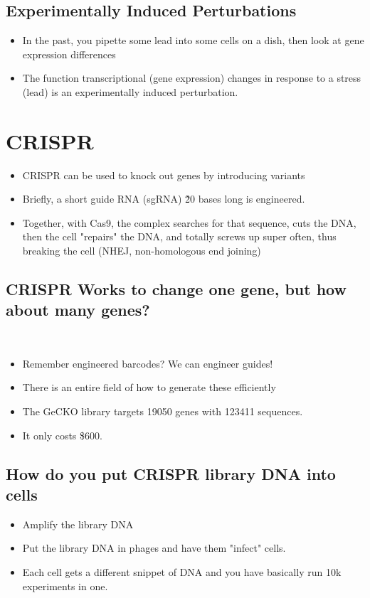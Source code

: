 \documentclass[10pt]{article}
\begin{document}
\subsection*{Experimentally Induced Perturbations}
\begin{itemize}
    \item In the past, you pipette some lead into some cells on a dish, then look at gene expression differences
    \item The function transcriptional (gene expression) changes in response to a stress (lead) is an experimentally induced perturbation.
\end{itemize}

\section*{CRISPR}
\begin{itemize}
    \item CRISPR can be used to knock out genes by introducing variants
    \item Briefly, a short guide RNA (sgRNA) \~20 bases long is engineered.
    \item Together, with Cas9, the complex searches for that sequence, cuts the DNA, then the cell "repairs" the DNA, and totally screws up super often, thus breaking the cell (NHEJ, non-homologous end joining)
\end{itemize}

\subsection*{CRISPR Works to change one gene, but how about many genes?}\
\begin{itemize}
    \item Remember engineered barcodes?  We can engineer guides!
    \item There is an entire field of how to generate these efficiently
    \item The GeCKO library targets 19050 genes with 123411 sequences.
    \item It only costs \$600.
\end{itemize}

\subsection*{How do you put CRISPR library DNA into cells}
\begin{itemize}
    \item Amplify the library DNA
    \item Put the library DNA in phages and have them "infect" cells.
    \item Each cell gets a different snippet of DNA and you have basically run 10k experiments in one.
\end{itemize}
\end{document}

